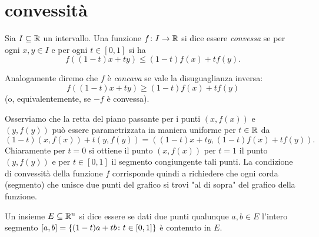 \section{convessità}

\begin{definition}
\mymark{**}
Sia $I\subseteq \mathbb R$ un intervallo.
Una funzione $f\colon I\to \mathbb R$
si dice essere
\emph{convessa}
se per ogni $x,y\in I$ e per ogni $t\in [0,1]$ si ha
\[
f((1-t)x + ty) \le (1-t) f(x) + t f(y).
\]

Analogamente diremo che $f$ è \emph{concava} 
se vale la disuguaglianza inversa:
\[
f((1-t)x + ty) \ge (1-t) f(x) + t f(y)
\]
(o, equivalentemente, se $-f$ è convessa).
\end{definition}

Osserviamo che la retta del piano passante per i punti $(x,f(x))$ e $(y,f(y))$ può essere parametrizzata in maniera uniforme per $t\in \mathbb R$
da
\[
  (1-t) (x,f(x)) + t(y,f(y)) = ((1-t)x + ty, (1-t) f(x) + tf(y)).
\]
Chiaramente per $t=0$ si ottiene il punto $(x,f(x))$ per $t=1$ il punto $(y,f(y))$ e per $t\in[0,1]$ il segmento congiungente tali punti. La condizione di convessità della funzione $f$ corrisponde quindi a richiedere che ogni corda (segmento) che unisce due punti del grafico si trovi "al di sopra" del grafico della funzione.

\begin{definition}
\mymark{*}
Un insieme $E\subseteq \mathbb R^n$ si dice essere  se dati
due punti qualunque $a,b\in E$ l'intero segmento $[a,b]={\left\{ (1-t)a+tb\colon t\in [0,1] \right\}}$ è contenuto in $E$.
\end{definition}

